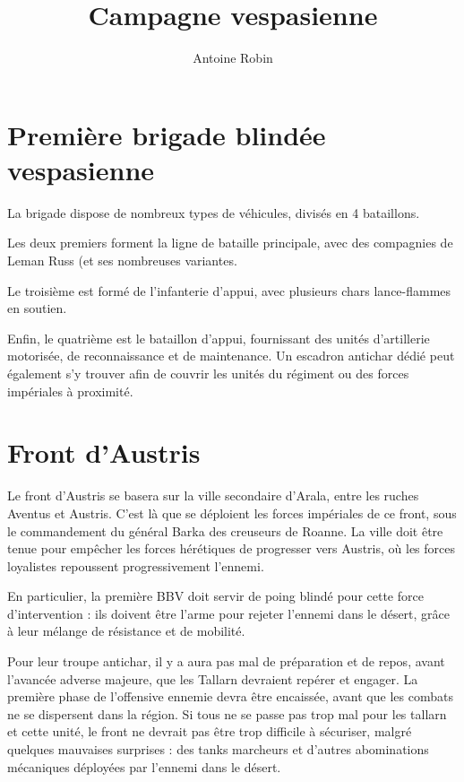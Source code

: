 \documentclass[10pt,a4paper]{book}
\author{ Antoine Robin}
\title{Campagne vespasienne}
\begin{document}
\maketitle
\chapter{Première brigade blindée vespasienne}
La brigade dispose de nombreux types de véhicules, divisés en 4 bataillons.

Les deux premiers forment la ligne de bataille principale, avec des compagnies de Leman Russ (et ses nombreuses variantes.

Le troisième est formé de l'infanterie d'appui, avec plusieurs chars lance-flammes en soutien.

Enfin, le quatrième est le bataillon d'appui, fournissant des unités d'artillerie motorisée, de reconnaissance et de maintenance. Un escadron antichar dédié peut également s'y trouver afin de couvrir les unités du régiment ou des forces impériales à proximité.
\chapter{Front d'Austris}
Le front d'Austris se basera sur la ville secondaire d'Arala, entre les ruches Aventus et Austris. C'est là que se déploient les forces impériales de ce front, sous le commandement du général Barka des creuseurs de Roanne. La ville doit être tenue pour empêcher les forces hérétiques de progresser vers Austris, où les forces loyalistes repoussent progressivement l'ennemi.

En particulier, la première BBV doit servir de poing blindé pour cette force d'intervention : ils doivent être l'arme pour rejeter l'ennemi dans le désert, grâce à leur mélange de résistance et de mobilité. 

Pour leur troupe antichar, il y a aura pas mal de préparation et de repos, avant l'avancée adverse majeure, que les Tallarn devraient repérer et engager. La première phase de l'offensive ennemie devra être encaissée, avant que les combats ne se dispersent dans la région. Si tous ne se passe pas trop mal pour les tallarn et cette unité, le front ne devrait pas être trop difficile à sécuriser, malgré quelques mauvaises surprises : des tanks marcheurs et d'autres abominations mécaniques déployées par l'ennemi dans le désert.
\end{document}
